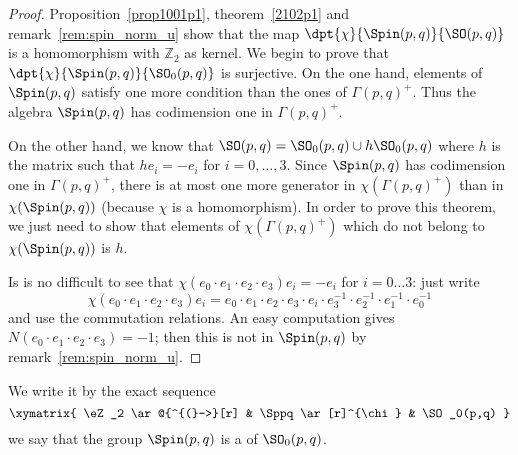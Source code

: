 \begin{proof}
Proposition~\ref{prop1001p1}, theorem~\ref{2102p1} and remark~\ref{rem:spin_norm_u} show that the map $\dpt{\chi}{\Spin(p,q)}{\SO(p,q)}$ is a homomorphism with $\mathbb{Z}_2$ as kernel. We begin to prove that $\dpt{\chi}{\Spin(p,q)}{\SO_0(p,q)}$ is surjective. On the one hand, elements of $\Spin(p,q)$ satisfy one more condition than the ones of $\Gamma(p,q)^+$. Thus the algebra $\Spin(p,q)$ has codimension one in $\Gamma(p,q)^+$.

On the other hand, we know that $\SO(p,q)=\SO_0(p,q)\cup h\SO_0(p,q)$ where $h$ is the matrix such that $he_i=-e_i$ for $i=0,\ldots,3$. Since $\Spin(p,q)$ has codimension one in $\Gamma(p,q)^+$, there is at most one more generator in $\chi(\Gamma(p,q)^+)$ than in $\chi(\Spin(p,q))$ (because $\chi$ is a homomorphism). In order to prove this theorem, we just need to show that elements of $\chi(\Gamma(p,q)^+)$ which do not belong to $\chi(\Spin(p,q))$ is $h$.

Is is no difficult to see that $\chi(e_0\cdot e_1\cdot e_2\cdot e_3)e_i=-e_i$ for $i=0\ldots 3$: just write
\begin{equation}
\chi(e_0\cdot e_1\cdot e_2\cdot e_3)e_i=e_0\cdot e_1\cdot e_2\cdot e_3\cdot e_i\cdot e_3^{-1}\cdot e_2^{-1}\cdot e_1^{-1}\cdot e_0^{-1}
\end{equation}
and use the commutation relations. An easy computation gives
$N(e_0\cdot e_1\cdot e_2\cdot e_3)=-1$; then this is not in $\Spin(p,q)$ by remark~\ref{rem:spin_norm_u}.
\end{proof}

We write it by the exact sequence
\begin{equation}
 \xymatrix{
    \eZ_2  \ar@{^{(}->}[r] & \Sppq \ar[r]^{\chi} & \SO_0(p,q)
  }
\end{equation}
we say that the group $\Spin(p,q)$ is a  of $\SO_0(p,q)$.

